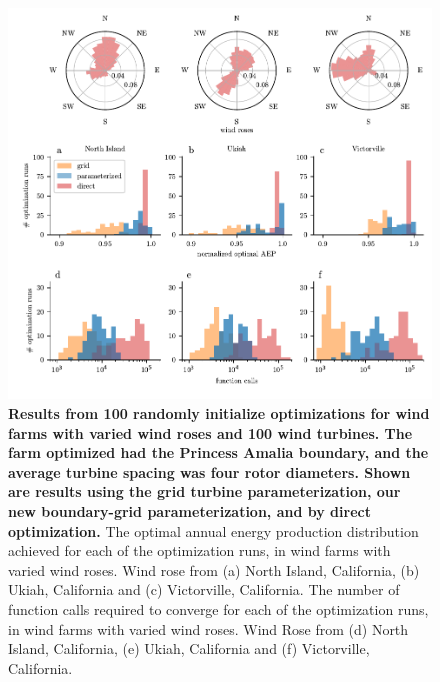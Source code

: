 \documentclass[wes, manuscript]{copernicus}
\providecommand{\DIFaddbeginFL}{} %
\providecommand{\DIFaddendFL}{} %
\providecommand{\DIFdelbeginFL}{} %
\providecommand{\DIFdelendFL}{} %
\begin{document}
\begin{figure}
\centering
\DIFdelbeginFL %
\DIFdelendFL \DIFaddbeginFL \includegraphics{paper-figures/results_rosesR1.pdf}
\DIFaddendFL \caption{\textbf{Results from 100 randomly initialize optimizations for wind farms with varied wind roses and 100 wind turbines. The farm optimized had the Princess Amalia boundary, and the average turbine spacing was four rotor diameters. Shown are results using the grid turbine parameterization, our new boundary-grid parameterization, and by direct optimization.} The optimal annual energy production distribution achieved for each of the optimization runs, in wind farms with varied wind roses.  Wind rose from (a) North Island, California, (b) Ukiah, California and (c) Victorville, California. The number of function calls required to converge for each of the optimization runs, in wind farms with varied wind roses. Wind Rose from (d) North Island, California, (e) Ukiah, California and (f) Victorville, California. }
\label{results-roses}
\end{figure}
\end{document}
